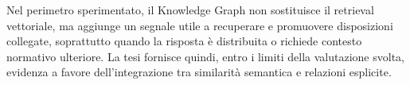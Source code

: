 Nel perimetro sperimentato, il Knowledge Graph non sostituisce il retrieval vettoriale, ma aggiunge un segnale utile a recuperare e promuovere disposizioni collegate, soprattutto quando la risposta è distribuita o richiede contesto normativo ulteriore. La tesi fornisce quindi, entro i limiti della valutazione svolta, evidenza a favore dell'integrazione tra similarità semantica e relazioni esplicite.
